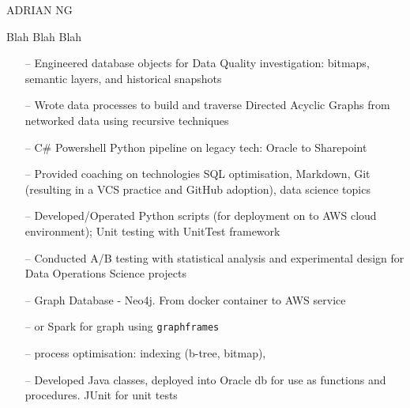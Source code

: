 \documentclass[10pt,a4paper]{altacv}
\begin{document}
\tagline{}

%

\begin{fullwidth}
\namefont\color{name}\MakeUppercase{Adrian Ng}\par
\end{fullwidth}

%



Blah Blah Blah



\begin{itemize}
    \setlength{\itemindent}{0.5em}
    \item[--]   \small{Engineered database objects for Data Quality investigation: bitmaps, semantic layers, and historical snapshots}
    \item[--]   \small{Wrote data processes to build and traverse Directed Acyclic Graphs from networked data using recursive techniques} 
    \item[--]   \small{C\# Powershell Python pipeline on legacy tech: Oracle to Sharepoint} 
    \item[--]   \small{Provided coaching on technologies SQL optimisation, Markdown, Git (resulting in a VCS practice and GitHub adoption), data science topics}
    \item[--]   \small{Developed/Operated Python scripts (for deployment on to AWS cloud environment); Unit testing with UnitTest framework} 
    \item[--]   \small{Conducted A/B testing with statistical analysis and experimental design for Data Operations Science projects}  
    \item[--]   \small{Graph Database - Neo4j. From docker container to AWS service} 
    \item[--]   \small{or Spark for graph using \texttt{graphframes}} 
    \item[--]   \small{process optimisation: indexing (b-tree, bitmap), }
    \item[--]   \small{Developed Java classes, deployed into Oracle db for use as functions and procedures. JUnit for unit tests}
  \end{itemize}
\end{document}
